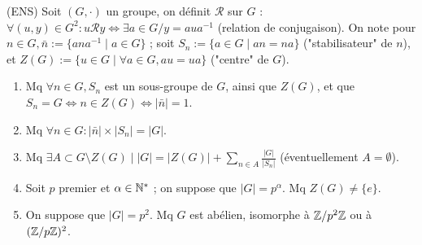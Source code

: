 \begin{statementbox}
(ENS) Soit $(G,\cdot)$ un groupe, on définit $\mathcal{R}$ sur $G$ :
$\forall (u,y) \in G^2 : u \mathcal{R} y \iff \exists a \in G / y = a u a^{-1}$ (relation de conjugaison).
On note pour $n \in G, \bar{n} := \{a n a^{-1} \mid a \in G\}$ ; soit $S_n := \{a \in G \mid a n = n a\}$ ("stabilisateur" de $n$), et $Z(G) := \{u \in G \mid \forall a \in G, a u = u a\}$ ("centre" de $G$).
\begin{enumerate}[label=\alph*)]
  \item Mq $\forall n \in G, S_n$ est un sous-groupe de $G$, ainsi que $Z(G)$, et que $S_n = G \iff n \in Z(G) \iff |\bar{n}| = 1$.
  \item Mq $\forall n \in G : |\bar{n}| \times |S_n| = |G|$.
  \item Mq $\exists A \subset G \setminus Z(G) \mid |G| = |Z(G)| + \sum_{n \in A} \frac{|G|}{|S_n|}$ (éventuellement $A = \emptyset$).
  \item Soit $p$ premier et $\alpha \in \mathbb N^*$ ; on suppose que $|G| = p^\alpha$. Mq $Z(G) \neq \{e\}$.
  \item On suppose que $|G| = p^2$. Mq $G$ est abélien, isomorphe à $\mathbb Z/p^2\mathbb Z$ ou à $(\mathbb Z/p\mathbb Z)^2$.
\end{enumerate}
\end{statementbox}

